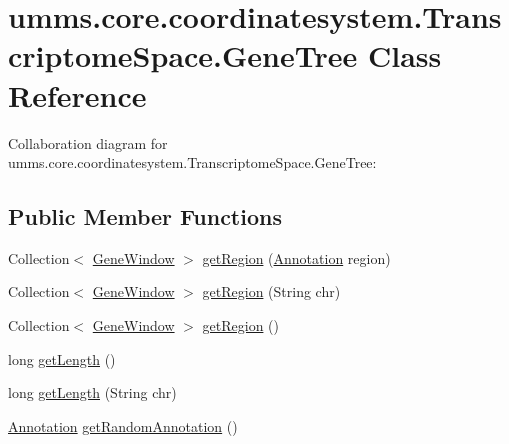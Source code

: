 \hypertarget{classumms_1_1core_1_1coordinatesystem_1_1_transcriptome_space_1_1_gene_tree}{\section{umms.\+core.\+coordinatesystem.\+Transcriptome\+Space.\+Gene\+Tree Class Reference}
\label{classumms_1_1core_1_1coordinatesystem_1_1_transcriptome_space_1_1_gene_tree}
}


Collaboration diagram for umms.\+core.\+coordinatesystem.\+Transcriptome\+Space.\+Gene\+Tree\+:
\subsection*{Public Member Functions}
\begin{DoxyCompactItemize}
\item 
Collection$<$ \hyperlink{classumms_1_1core_1_1feature_1_1_gene_window}{Gene\+Window} $>$ \hyperlink{classumms_1_1core_1_1coordinatesystem_1_1_transcriptome_space_1_1_gene_tree_a2812ecf6ec4ce7e66677e01961b3fb8a}{get\+Region} (\hyperlink{interfaceumms_1_1core_1_1annotation_1_1_annotation}{Annotation} region)
\item 
Collection$<$ \hyperlink{classumms_1_1core_1_1feature_1_1_gene_window}{Gene\+Window} $>$ \hyperlink{classumms_1_1core_1_1coordinatesystem_1_1_transcriptome_space_1_1_gene_tree_a2f5661708e0b7cc0c730e4c65769ac8d}{get\+Region} (String chr)
\item 
Collection$<$ \hyperlink{classumms_1_1core_1_1feature_1_1_gene_window}{Gene\+Window} $>$ \hyperlink{classumms_1_1core_1_1coordinatesystem_1_1_transcriptome_space_1_1_gene_tree_ae86848799e03a74aba88ea39f2cfa90e}{get\+Region} ()
\item 
long \hyperlink{classumms_1_1core_1_1coordinatesystem_1_1_transcriptome_space_1_1_gene_tree_a35a0578cbfa063328839d269629deed0}{get\+Length} ()
\item 
long \hyperlink{classumms_1_1core_1_1coordinatesystem_1_1_transcriptome_space_1_1_gene_tree_af0b40188d3157c862c48491e0e80550e}{get\+Length} (String chr)
\item 
\hyperlink{interfaceumms_1_1core_1_1annotation_1_1_annotation}{Annotation} \hyperlink{classumms_1_1core_1_1coordinatesystem_1_1_transcriptome_space_1_1_gene_tree_ad1ff961107c21cbfeeb4592ae11340cb}{get\+Random\+Annotation} ()
\end{DoxyCompactItemize}


